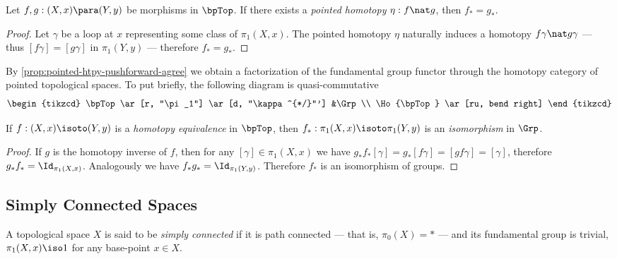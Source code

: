 \begin{proposition}
\label{prop:pointed-htpy-pushforward-agree}
Let \(f, g: (X, x) \para (Y, y)\) be morphisms in \(\bpTop\). If there exists a
\emph{pointed homotopy} \(\eta: f \nat g\), then \(f_{*} = g_{*}\).
\end{proposition}

\begin{proof}
Let \(\gamma\) be a loop at \(x\) representing some class of \(\pi_1(X,
x)\). The pointed homotopy \(\eta\) naturally induces a homotopy
\(f \gamma \nat g \gamma\) --- thus \([f \gamma] = [g \gamma]\) in
\(\pi_1(Y, y)\) --- therefore \(f_{*} = g_{*}\).
\end{proof}

By \cref{prop:pointed-htpy-pushforward-agree} we obtain a factorization of the
fundamental group functor through the homotopy category of pointed topological
spaces. To put briefly, the following diagram is quasi-commutative
\[
\begin{tikzcd}
\bpTop \ar[r, "\pi_1"] \ar[d, "\kappa^{*/}"'] &\Grp \\
\Ho{\bpTop} \ar[ru, bend right]
\end{tikzcd}
\]

\begin{corollary}
\label{cor:pushforward-preserve-isomorphism}
If \(f: (X, x) \isoto (Y, y)\) is a \emph{homotopy equivalence} in \(\bpTop\),
then \(f_{*}: \pi_1(X, x) \isoto \pi_1(Y, y)\) is an \emph{isomorphism} in
\(\Grp\).
\end{corollary}

\begin{proof}
If \(g\) is the homotopy inverse of \(f\), then for any
\([\gamma] \in \pi_1(X, x)\) we have
\(g_{*}f_{*} [\gamma] = g_{*}[f \gamma] = [g f \gamma] = [\gamma]\), therefore
\(g_{*} f_{*} = \Id_{\pi_1(X, x)}\). Analogously we have
\(f_{*} g_{*} = \Id_{\pi_1(Y, y)}\). Therefore \(f_{*}\) is an isomorphism of
groups.
\end{proof}

\subsection{Simply Connected Spaces}

\begin{definition}
\label{def:simply-connected}
A topological space \(X\) is said to be \emph{simply connected} if it is path
connected --- that is, \(\pi_0(X) = *\) --- and its fundamental group is
trivial, \(\pi_1(X, x) \iso 1\) for any base-point \(x \in X\).
\end{definition}

